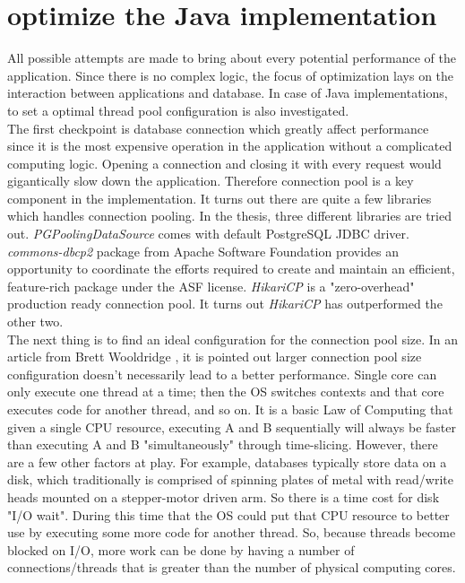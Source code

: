 \section{optimize the Java implementation}
All possible attempts are made to bring about every potential performance of the application. Since there is no complex logic, the focus of optimization lays on the interaction between applications and database. In case of Java implementations, to set a optimal thread pool configuration is also investigated. \\
The first checkpoint is database connection which greatly affect performance since it is the most expensive operation in the application without a complicated computing logic. Opening a connection and closing it with every request would gigantically slow down the application. Therefore connection pool is a key component in the implementation. It turns out there are quite a few libraries which handles connection pooling. In the thesis,  three different libraries are tried out. \textit{PGPoolingDataSource}  \citep{pgpool}   comes with default PostgreSQL JDBC driver. \textit{commons-dbcp2} \citep{dbcp} package from Apache Software Foundation provides an opportunity to coordinate the efforts required to create and maintain an efficient, feature-rich package under the \ac{ASF} license. \textit{HikariCP} is a "zero-overhead" production ready connection pool. It turns out \textit{HikariCP} \citep{hikari} has outperformed the other two. \\
The next thing is to find an ideal configuration for the connection pool size. In an article from Brett Wooldridge \citep{hikari}, it is pointed out larger connection pool size configuration doesn't necessarily lead to a better performance. Single core can only execute one thread at a time; then the OS switches contexts and that core executes code for another thread, and so on. It is a basic Law of Computing that given a single CPU resource, executing A and B sequentially will always be faster than executing A and B "simultaneously" through time-slicing. However, there are a few other factors at play. For example, databases typically store data on a disk, which traditionally is comprised of spinning plates of metal with read/write heads mounted on a stepper-motor driven arm. So there is a time cost for disk "I/O wait".  During this time that the OS could put that CPU resource to better use by executing some more code for another thread. So, because threads become blocked on I/O,  more work can be done by having a number of connections/threads that is greater than the number of physical computing cores.
